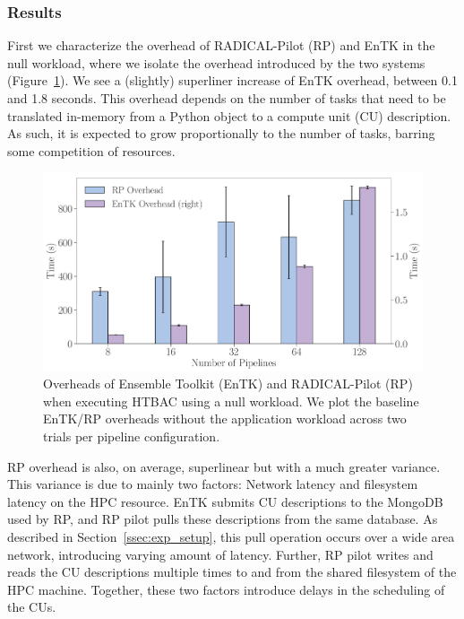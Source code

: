 \subsubsection{Results}\label{ssec:exp_results}

First we characterize the overhead of RADICAL-Pilot (RP) and EnTK in the 
null workload, where we isolate the %
overhead introduced by the two %
systems (Figure~\ref{fig:exp1}). We see a (slightly) superliner
increase of EnTK overhead, between 0.1 and 1.8 seconds. This overhead depends
on the number of tasks that need to be translated in-memory from a Python
object to a compute unit (CU) description. As such, it is expected to grow
proportionally to the number of tasks, barring some competition of resources.


\begin{figure}
  \centering
  \includegraphics[width=\columnwidth]{FIGURES/null_workload_overheads.pdf}
  \caption{Overheads of Ensemble Toolkit (EnTK) and RADICAL-Pilot (RP) when
           executing HTBAC using a null workload. We plot the baseline
           EnTK/RP overheads without the application workload across two
           trials per pipeline configuration.}\label{fig:exp1}
\end{figure}


RP overhead is also, on average, superlinear but with a much greater
variance. This variance is due to mainly two factors: Network latency and
filesystem latency on the HPC resource. EnTK submits CU descriptions to the
MongoDB used by RP, and RP pilot pulls these descriptions from the same
database. As described in Section~\ref{ssec:exp_setup}, this pull operation
occurs over a wide area network, introducing varying amount of latency.
Further, RP pilot writes and reads the CU descriptions multiple times to
and from the shared filesystem of the HPC machine. Together, these two
factors introduce delays in the scheduling of the CUs.

